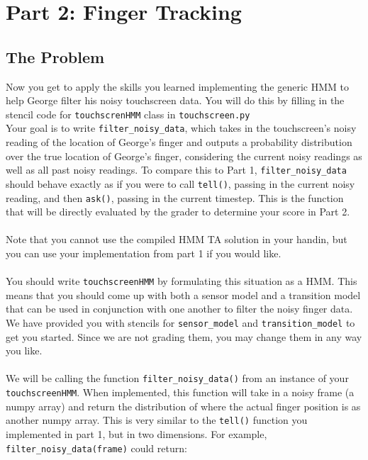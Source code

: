 \documentclass{article}
\begin{document}
    \section{Part 2: Finger Tracking}
    \subsection{The Problem}
    Now you get to apply the skills you learned implementing the generic HMM to help George filter his noisy touchscreen data. You will do this by filling in the stencil code for \texttt{touchscrenHMM} class in \texttt{touchscreen.py}\\

    Your goal is to write \texttt{filter\_noisy\_data}, which takes in the touchscreen’s noisy reading of the location of George’s finger and outputs a probability distribution over the true location of George’s finger, considering the current noisy readings as well as all past noisy readings. To compare this to Part 1, \texttt{filter\_noisy\_data} should behave exactly as if you were to call \texttt{tell()}, passing in the current noisy reading, and then \texttt{ask()}, passing in the current timestep. This is the function that will be directly evaluated by the grader to determine your score in Part 2. 
    \\\\
    Note that you cannot use the compiled HMM TA solution in your handin, but you can use your implementation from part 1 if you would like. 
    \\\\
    You should write \texttt{touchscreenHMM} by formulating this situation as a HMM. This means that you should come up with both a sensor model and a transition model that can be used in conjunction with one another to filter the noisy finger data. We have provided you with stencils for \texttt{sensor\_model} and \texttt{transition\_model} to get you started. Since we are not grading them, you may change them in any way you like.
    \\\\
    We will be calling the function \texttt{filter\_noisy\_data()} from an instance of your \texttt{touchscreenHMM}. When implemented, this function will take in a noisy frame (a numpy array) and return the distribution of where the actual finger position is as another numpy array. This is very similar to the \texttt{tell()} function you implemented in part 1, but in two dimensions. For example, \texttt{filter\_noisy\_data(frame)} could return:
\end{document}
